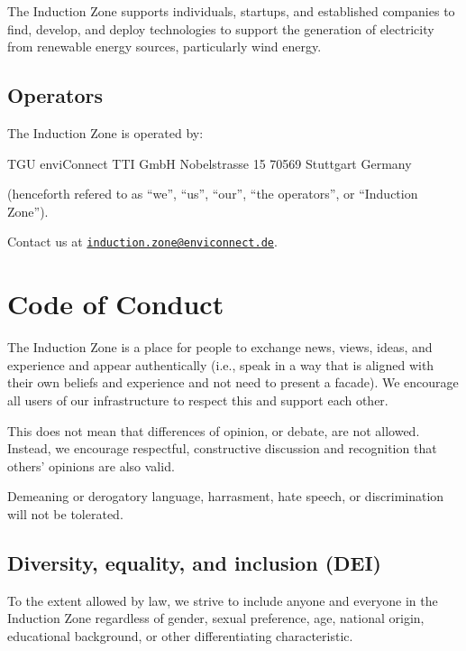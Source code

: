 \documentclass[
  10pt,
  a4paper,
]{article}
\begin{document}
The Induction Zone supports individuals, startups, and established
companies to find, develop, and deploy technologies to support the
generation of electricity from renewable energy sources, particularly
wind energy.

\hypertarget{operators}{%
\subsection{Operators}\label{operators}}

The Induction Zone is operated by:

TGU enviConnect TTI GmbH Nobelstrasse 15 70569 Stuttgart Germany

(henceforth refered to as ``we'', ``us'', ``our'', ``the operators'', or
``Induction Zone'').

Contact us at
\href{mailto:induction.zone@enviconnect.de}{\nolinkurl{induction.zone@enviconnect.de}}.

\hypertarget{code-of-conduct}{%
\section{Code of Conduct}\label{code-of-conduct}}

The Induction Zone is a place for people to exchange news, views, ideas,
and experience and appear authentically (i.e., speak in a way that is
aligned with their own beliefs and experience and not need to present a
facade). We encourage all users of our infrastructure to respect this
and support each other.

This does not mean that differences of opinion, or debate, are not
allowed. Instead, we encourage respectful, constructive discussion and
recognition that others' opinions are also valid.

Demeaning or derogatory language, harrasment, hate speech, or
discrimination will not be tolerated.

\hypertarget{diversity-equality-and-inclusion-dei}{%
\subsection{Diversity, equality, and inclusion
(DEI)}\label{diversity-equality-and-inclusion-dei}}

To the extent allowed by law, we strive to include anyone and everyone
in the Induction Zone regardless of gender, sexual preference, age,
national origin, educational background, or other differentiating
characteristic.
\end{document}
